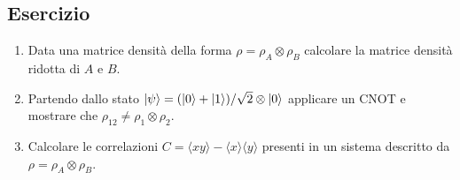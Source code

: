 \documentclass[../../InformazioneQuantistica.tex]{subfiles}
\begin{document}
\subsection{Esercizio \theEsercizio}
\begin{enumerate}
\item Data una matrice densità della forma $\rho = \rho_A \otimes \rho_B$  calcolare la matrice densità ridotta di $A$ e $B$.
\item Partendo dallo stato $\Ket{\psi}= (\Ket{0}+\Ket{1})/\sqrt{2} \otimes \Ket{0}$ applicare un CNOT e mostrare che $\rho_{12}\neq \rho_1 \otimes \rho_2$.
\item Calcolare le correlazioni $C=\langle x y\rangle - \langle x \rangle \langle y\rangle$ presenti in un sistema descritto da $\rho =\rho_A \otimes \rho_B$.
\end{enumerate}
\end{document}
